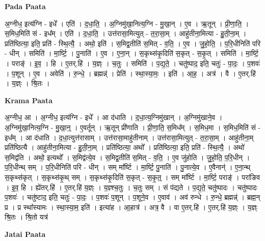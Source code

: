 \documentclass[17pt]{extarticle}
\begin{document}
\textbf{Pada Paata} \newline

अ॒ग्नीध॒ इत्य॑ग्नि - इधे᳚ । एति॑ । द॒धा॒ति॒ । अ॒ग्निमु॑खा॒नित्य॒ग्नि - मु॒खा॒न् । ए॒व । ऋ॒तून् । प्री॒णा॒ति॒ । स॒मिध॒मिति॑ सं - इध᳚म् । एति॑ । द॒धा॒ति॒ । उत्त॑रासा॒मित्युत् - त॒रा॒सा॒म् । आहु॑तीना॒मित्या - हु॒ती॒ना॒म् । प्रति॑ष्ठित्या॒ इति॒ प्रति॑ - स्थि॒त्यै॒ । अथो॒ इति॑ । स॒मिद्व॒तीति॑ स॒मित् - व॒ति॒ । ए॒व । जु॒हो॒ति॒ । प॒रि॒धीनिति॑ परि - धीन् । समिति॑ । मा॒र्ष्टि॒ । पु॒नाति॑ । ए॒व । ए॒ना॒न् । स॒कृथ्स॑कृ॒दिति॑ स॒कृत् - स॒कृ॒त् । समिति॑ । मा॒र्ष्टि॒ । पराङ्॑ । इ॒व॒ । हि । ए॒तर्.हि॑ । य॒ज्ञ्ः । च॒तुः । समिति॑ । प॒द्य॒ते॒ । चतु॑ष्पाद॒ इति॒ चतुः॑ - पा॒दः॒ । प॒शवः॑ । प॒शून् । ए॒व । अवेति॑ । रु॒न्धे॒ । ब्रह्मन्न्॑ । प्रेति॑ । स्था॒स्या॒मः॒ । इति॑ । आ॒ह॒ । अत्र॑ । वै । ए॒तर्.हि॑ । य॒ज्ञ्ः । श्रि॒तः ।  \newline


\textbf{Krama Paata} \newline

अ॒ग्नीध॒ आ । अ॒ग्नीध॒ इत्य॑ग्नि - इधे᳚ । आ द॑धाति । द॒धा॒त्य॒ग्निमु॑खान् । अ॒ग्निमु॑खाने॒व । अ॒ग्निमु॑खा॒नित्य॒ग्नि - मु॒खा॒न्॒ । ए॒वर्तून् । ऋ॒तून् प्री॑णाति । प्री॒णा॒ति॒ स॒मिध᳚म् । स॒मिध॒मा । स॒मिध॒मिति॑ सं - इध᳚म् । आ द॑धाति । द॒धा॒त्युत्त॑रासाम् । उत्त॑रासा॒माहु॑तीनाम् । उत्त॑रासा॒मित्युत् - त॒रा॒सा॒म् । आहु॑तीना॒म् प्रति॑ष्ठित्यै । आहु॑तीना॒मित्या - हु॒ती॒ना॒म् । प्रति॑ष्ठित्या॒ अथो᳚ । प्रति॑ष्ठित्या॒ इति॒ प्रति॑ - स्थि॒त्यै॒ । अथो॑ स॒मिद्व॑ति । अथो॒ इत्यथो᳚ । स॒मिद्व॑त्ये॒व । स॒मिद्व॒तीति॑ स॒मित् - व॒ति॒ । ए॒व जु॑होति । जु॒हो॒ति॒ प॒रि॒धीन् । प॒रि॒धीन्थ् सम् । प॒रि॒धीनिति॑ परि - धीन् । सम् मा᳚र्ष्टि । मा॒र्ष्टि॒ पु॒नाति॑ । पु॒नात्ये॒व । ए॒वैनान्॑ । ए॒ना॒न्थ् स॒कृथ्स॑कृत् । स॒कृथ्स॑कृ॒थ् सम् । स॒कृथ्स॑कृ॒दिति॑ स॒कृत् - स॒कृ॒त्॒ । सम् मा᳚र्ष्टि । मा॒र्ष्टि॒ पराङ्॑ । परा॑ङिव । इ॒व॒ हि । ह्ये॑तर्.हि॑ । ए॒तर्.हि॑ य॒ज्ञ्ः । य॒ज्ञ्श्च॒तुः । च॒तुः सम् । सं प॑द्यते । प॒द्य॒ते॒ चतु॑ष्पादः । चतु॑ष्पादः प॒शवः॑ । चतु॑ष्टाद॒ इति॒ चतुः॑ - पा॒दः॒ । प॒शवः॑ प॒शून् । प॒शूने॒व । ए॒वाव॑ । अव॑ रुन्धे । रु॒न्धे॒ ब्रह्मन्न्॑ । ब्रह्म॒न् प्र । प्र स्था᳚स्यामः । स्था॒स्या॒म॒ इति॑ । इत्या॑ह । आ॒हात्र॑ । अत्र॒ वै । वा ए॒तर्.हि॑ । ए॒तर्.हि॑ य॒ज्ञ्ः । य॒ज्ञ्ः श्रि॒तः । श्रि॒तो यत्र॑ \newline

\textbf{Jatai Paata} \newline
\end{document}
